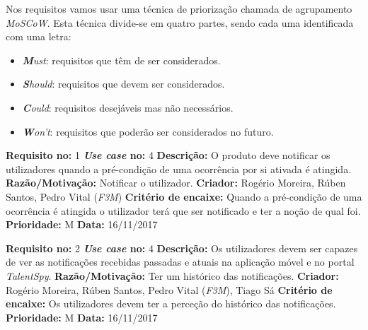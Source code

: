 Nos requisitos vamos usar uma técnica de priorização chamada de agrupamento \emph{MoSCoW}. Esta técnica divide-se em quatro partes, sendo cada uma identificada com uma letra:
\begin{itemize}
\item \emph{\textbf{M}ust}: requisitos que têm de ser considerados.
\item \emph{\textbf{S}hould}: requisitos que devem ser considerados.
\item \emph{\textbf{C}ould}: requisitos desejáveis mas não necessários.
\item \emph{\textbf{W}on’t}: requisitos que poderão ser considerados no futuro.
\end{itemize}

\newpage

\begin{framed}
\noindent\textbf{Requisito no:} 1
\qquad
\textbf{\emph{Use case} no:} 4
\vspace{2mm}
\newline\textbf{Descrição:} O produto deve notificar os utilizadores quando a pré-condição de uma ocorrência por si ativada é atingida.
\vspace{1mm}
\newline\textbf{Razão/Motivação:} Notificar o utilizador.
\vspace{1mm}
\newline\textbf{Criador:} Rogério Moreira, Rúben Santos, Pedro Vital (\emph{F3M})
\vspace{1mm}
\newline\textbf{Critério de encaixe:} Quando a pré-condição de uma ocorrência é atingida o utilizador terá que ser notificado e ter a noção de qual foi.
\vspace{1mm}
\newline\textbf{Prioridade:} M
\vspace{1mm}
\newline\textbf{Data:} 16/11/2017
\end{framed}

\begin{framed}
\noindent\textbf{Requisito no:} 2
\qquad
\textbf{\emph{Use case} no:} 4
\vspace{2mm}
\newline\textbf{Descrição:} Os utilizadores devem ser capazes de ver as notificações recebidas passadas e atuais na aplicação móvel e no portal \emph{TalentSpy}.
\vspace{1mm}
\newline\textbf{Razão/Motivação:} Ter um histórico das notificações.
\vspace{1mm}
\newline\textbf{Criador:} Rogério Moreira, Rúben Santos, Pedro Vital (\emph{F3M}), Tiago Sá
\vspace{1mm}
\newline\textbf{Critério de encaixe:} Os utilizadores devem ter a perceção do histórico das notificações.
\vspace{1mm}
\newline\textbf{Prioridade:} M
\vspace{1mm}
\newline\textbf{Data:} 16/11/2017
\end{framed}

